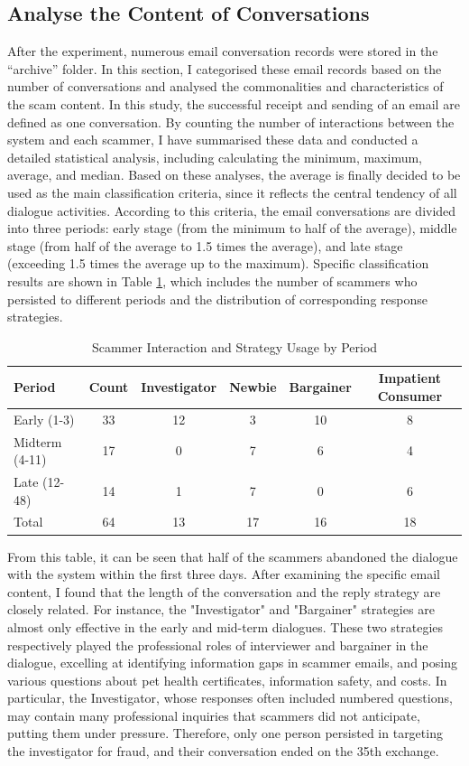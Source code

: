 \documentclass[ oneside,%
                    author={Cassie Qing Tang},
                    degree={BSc},
                     title={An Automated Response System for Disrupting Online Pet Scamming \\ },
                    subtitle={ }]{dissertation}
\begin{document}
\subsection{Analyse the Content of Conversations}
After the experiment, numerous email conversation records were stored in the “archive” folder. In this section, I categorised these email records based on the number of conversations and analysed the commonalities and characteristics of the scam content. In this study, the successful receipt and sending of an email are defined as one conversation. By counting the number of interactions between the system and each scammer, I have summarised these data and conducted a detailed statistical analysis, including calculating the minimum, maximum, average, and median. Based on these analyses, the average is finally decided to be used as the main classification criteria, since it reflects the central tendency of all dialogue activities. According to this criteria, the email conversations are divided into three periods: early stage (from the minimum to half of the average), middle stage (from half of the average to 1.5 times the average), and late stage (exceeding 1.5 times the average up to the maximum). Specific classification results are shown in Table \ref{tab:table4}, which includes the number of scammers who persisted to different periods and the distribution of corresponding response strategies.
\begin{table}[H]
\centering
\begin{tabular}{@{}lccccc@{}} 
\toprule
Period & Count & Investigator & Newbie & Bargainer & Impatient Consumer \\ 
\midrule
Early (1-3) & 33 & 12 & 3 & 10 & 8 \\
Midterm (4-11) & 17 & 0 & 7 & 6 & 4 \\
Late (12-48) & 14 & 1 & 7 & 0 & 6 \\
Total  & 64 & 13 & 17 & 16 & 18 \\
\bottomrule
\end{tabular}
\caption{Scammer Interaction and Strategy Usage by Period}
\label{tab:table4}
\end{table}

From this table, it can be seen that half of the scammers abandoned the dialogue with the system within the first three days. After examining the specific email content, I found that the length of the conversation and the reply strategy are closely related. For instance, the "Investigator" and "Bargainer" strategies are almost only effective in the early and mid-term dialogues. These two strategies respectively played the professional roles of interviewer and bargainer in the dialogue, excelling at identifying information gaps in scammer emails, and posing various questions about pet health certificates, information safety, and costs. In particular, the Investigator, whose responses often included numbered questions, may contain many professional inquiries that scammers did not anticipate, putting them under pressure. Therefore, only one person persisted in targeting the investigator for fraud, and their conversation ended on the 35th exchange.
\\
\end{document}
